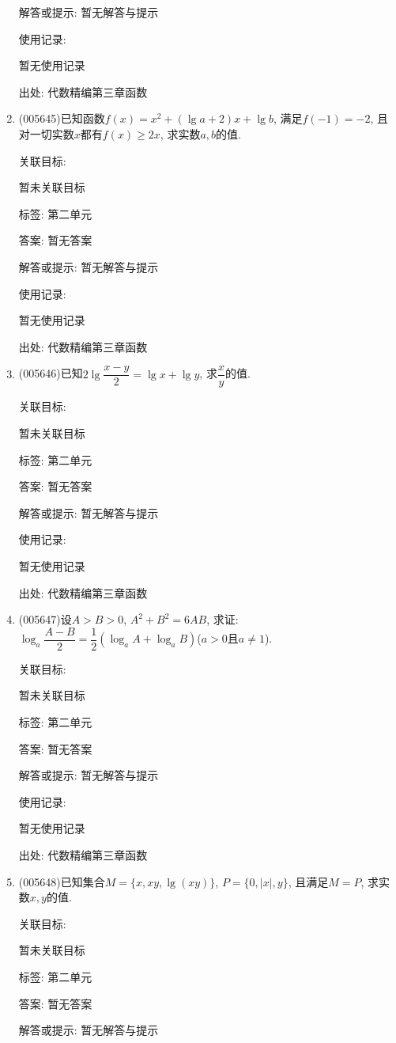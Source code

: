 \documentclass[10pt,a4paper]{article}
\begin{document}
\begin{enumerate}[1.]
解答或提示: 暂无解答与提示

使用记录:

暂无使用记录


出处: 代数精编第三章函数
\item { (005645)}已知函数$f(x)=x^2+(\lg a+2)x+\lg b$, 满足$f(-1)=-2$, 且对一切实数$x$都有$f(x)\ge 2x$, 求实数$a,b$的值.


关联目标:

暂未关联目标



标签: 第二单元

答案: 暂无答案

解答或提示: 暂无解答与提示

使用记录:

暂无使用记录


出处: 代数精编第三章函数
\item { (005646)}已知$2\lg \dfrac{x-y}2=\lg x+\lg y$, 求$\dfrac xy$的值.


关联目标:

暂未关联目标



标签: 第二单元

答案: 暂无答案

解答或提示: 暂无解答与提示

使用记录:

暂无使用记录


出处: 代数精编第三章函数
\item { (005647)}设$A>B>0$, $A^2+B^2=6AB$, 求证: $\log_a\dfrac{A-B}2=\dfrac 12(\log_aA+\log_aB)$($a>0$且$a\ne 1$).


关联目标:

暂未关联目标



标签: 第二单元

答案: 暂无答案

解答或提示: 暂无解答与提示

使用记录:

暂无使用记录


出处: 代数精编第三章函数
\item { (005648)}已知集合$M=\{x,xy,\lg (xy)\}$, $P=\{0,|x|,y\}$, 且满足$M=P$, 求实数$x,y$的值.


关联目标:

暂未关联目标



标签: 第二单元

答案: 暂无答案

解答或提示: 暂无解答与提示


\end{enumerate}
\end{document}
